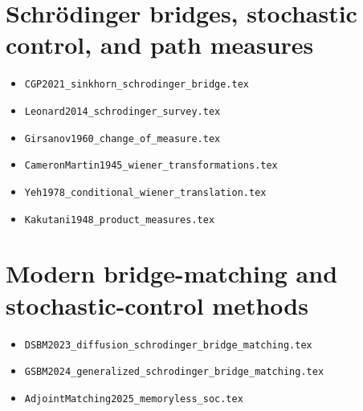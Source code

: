 \section*{Schrödinger bridges, stochastic control, and path measures}
\begin{itemize}
\item \texttt{CGP2021\_sinkhorn\_schrodinger\_bridge.tex}
\item \texttt{Leonard2014\_schrodinger\_survey.tex}
\item \texttt{Girsanov1960\_change\_of\_measure.tex}
\item \texttt{CameronMartin1945\_wiener\_transformations.tex}
\item \texttt{Yeh1978\_conditional\_wiener\_translation.tex}
\item \texttt{Kakutani1948\_product\_measures.tex}
\end{itemize}

\section*{Modern bridge-matching and stochastic-control methods}
\begin{itemize}
\item \texttt{DSBM2023\_diffusion\_schrodinger\_bridge\_matching.tex}
\item \texttt{GSBM2024\_generalized\_schrodinger\_bridge\_matching.tex}
\item \texttt{AdjointMatching2025\_memoryless\_soc.tex}
\end{itemize}



